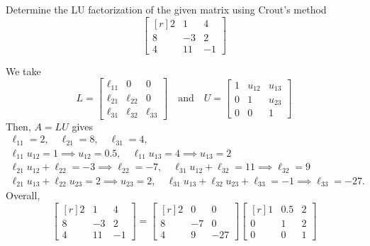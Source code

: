 \documentclass[11pt]{penrose}
\begin{document}
\begin{problem}{2}
    Determine the LU factorization of the given matrix using Crout's method
    \begin{equation*}
        \begin{bmatrix*}[r] 2 & 1 & 4 \\ 8 & -3 & 2 \\ 4 & 11 & -1 \end{bmatrix*}
    \end{equation*}

    \solution We take
    \begin{equation*}
        L = \begin{bmatrix*} \ell_{11} & 0 & 0 \\ \ell_{21} & \ell_{22} & 0 \\ \ell_{31} & \ell_{32} & \ell_{33} \end{bmatrix*}
        \quad\text{and}\quad
        U = \begin{bmatrix*} 1 & u_{12} & u_{13} \\ 0 & 1 & u_{23} \\ 0 & 0 & 1 \end{bmatrix*}
    \end{equation*}
    Then, $A = LU$ gives
    \begin{gather*}
        \ell_{11} = 2, \quad \ell_{21} = 8, \quad \ell_{31} = 4,\\
        \ell_{11} u_{12} = 1 \implies u_{12} = 0.5, \quad \ell_{11} u_{13} = 4 \implies u_{13} = 2\\
        \ell_{21} u_{12} + \ell_{22} = -3 \implies \ell_{22} = -7, \quad \ell_{31} u_{12} + \ell_{32} = 11 \implies \ell_{32} = 9\\
        \ell_{21} u_{13} + \ell_{22} u_{23} = 2 \implies u_{23} = 2, \quad \ell_{31} u_{13} + \ell_{32} u_{23} + \ell_{33} = -1 \implies \ell_{33} = -27.
    \end{gather*}
    Overall,
    \begin{equation*}
        \begin{bmatrix*}[r] 2 & 1 & 4 \\ 8 & -3 & 2 \\ 4 & 11 & -1 \end{bmatrix*}
        = \begin{bmatrix*}[r] 2 & 0 & 0 \\ 8 & -7 & 0 \\ 4 & 9 & -27 \end{bmatrix*}
        \begin{bmatrix*}[r] 1 & 0.5 & 2 \\ 0 & 1 & 2 \\ 0 & 0 & 1 \end{bmatrix*}
    \end{equation*}
\end{problem}
\end{document}
